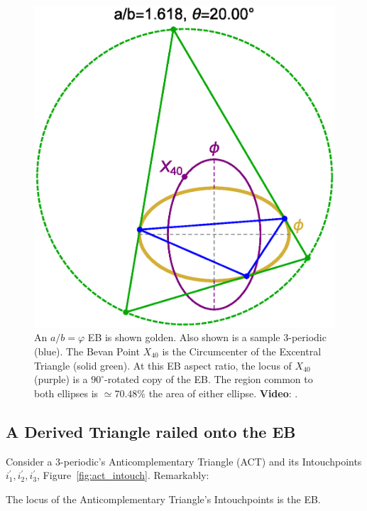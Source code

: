 \begin{figure}
    \centering
    \includegraphics[width=.5\textwidth]{pics/1070_x40.eps}
    \caption{An $a/b=\varphi$ EB is shown golden. Also shown is a sample 3-periodic (blue). The Bevan Point $X_{40}$ is the Circumcenter of the Excentral Triangle (solid green). At this EB aspect ratio, the locus of $X_{40}$ (purple) is a $90^\circ$-rotated copy of the EB. The region common to both ellipses is ${\simeq}70.48\%$ the area of either ellipse. \textbf{Video}: \cite[PL\#13]{reznik2020-playlist-intriguing}.}
    \label{fig:x40-golden}
\end{figure}

\subsection{A Derived Triangle railed onto the EB}

Consider a 3-periodic's Anticomplementary Triangle (ACT) \cite{mw} and its Intouchpoints $i_1^\prime,i_2^\prime,i_3^\prime$, Figure~\ref{fig:act_intouch}. Remarkably:

\begin{theorem}
The locus of the Anticomplementary Triangle's Intouchpoints is the EB.
\end{theorem}

